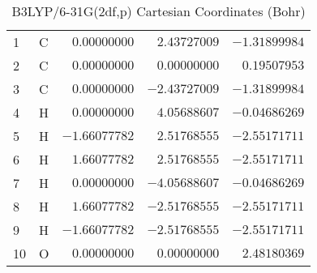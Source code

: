 \documentclass[10pt,oneside]{article}
\begin{document}
\begin{table}[h!]
\centering
\caption{B3LYP/6-31G(2df,p) Cartesian Coordinates (Bohr)}
\begin{tabular}{llrrr}
1  & C  & $ 0.00000000$ & $ 2.43727009$ & $-1.31899984$ \\
2  & C  & $ 0.00000000$ & $ 0.00000000$ & $ 0.19507953$ \\
3  & C  & $ 0.00000000$ & $-2.43727009$ & $-1.31899984$ \\
4  & H  & $ 0.00000000$ & $ 4.05688607$ & $-0.04686269$ \\
5  & H  & $-1.66077782$ & $ 2.51768555$ & $-2.55171711$ \\
6  & H  & $ 1.66077782$ & $ 2.51768555$ & $-2.55171711$ \\
7  & H  & $ 0.00000000$ & $-4.05688607$ & $-0.04686269$ \\
8  & H  & $ 1.66077782$ & $-2.51768555$ & $-2.55171711$ \\
9  & H  & $-1.66077782$ & $-2.51768555$ & $-2.55171711$ \\
10 & O  & $ 0.00000000$ & $ 0.00000000$ & $ 2.48180369$ \\
\end{tabular}
\end{table}

\clearpage
\end{document}
